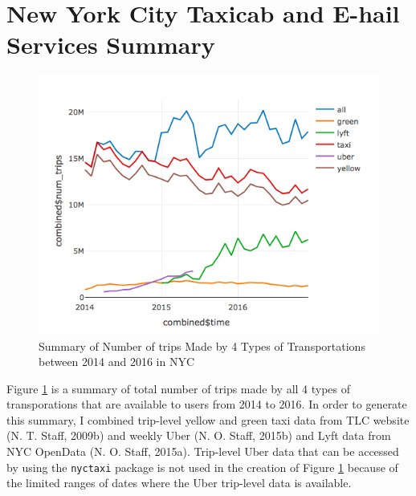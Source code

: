\documentclass[12pt,twoside]{reedthesis}
\theoremstyle{definition}
\theoremstyle{definition}
\theoremstyle{definition}
\theoremstyle{remark}
\begin{document}
\section{New York City Taxicab and E-hail Services
Summary}\label{new-york-city-taxicab-and-e-hail-services-summary}
\begin{figure}

{\centering \includegraphics[width=5.75in]{figure/Num_trips_summary} 

}

\caption{Summary of Number of trips Made by 4 Types of Transportations between 2014 and 2016 in NYC}\label{fig:num-trips-summary}
\end{figure}
Figure \ref{fig:num-trips-summary} is a summary of total number of trips
made by all 4 types of transporations that are available to users from
2014 to 2016. In order to generate this summary, I combined trip-level
yellow and green taxi data from TLC website (N. T. Staff, 2009b) and
weekly Uber (N. O. Staff, 2015b) and Lyft data from NYC OpenData (N. O.
Staff, 2015a). Trip-level Uber data that can be accessed by using the
\texttt{nyctaxi} package is not used in the creation of Figure
\ref{fig:num-trips-summary} because of the limited ranges of dates where
the Uber trip-level data is available.
\end{document}
